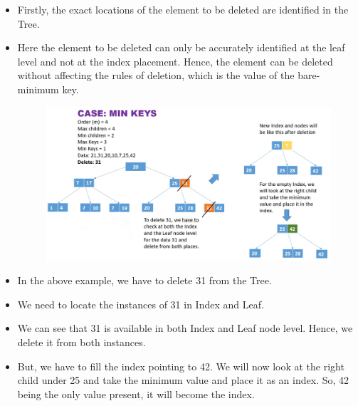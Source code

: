 \documentclass[11pt, a4paper]{article}
\begin{document}
\begin{itemize}
    \item Firstly, the exact locations of the element to be deleted are identified in the Tree.
    \item Here the element to be deleted can only be accurately identified at the leaf level and not at the index placement. Hence, the element can be deleted without affecting the rules of deletion, which is the value of the bare-minimum key.
    
    \begin{figure}[h]
    \centering
    \includegraphics[scale=.5]{del2.jpeg}
    \label{del2}
\end{figure}
    
    \item In the above example, we have to delete 31 from the Tree.
    \item We need to locate the instances of 31 in Index and Leaf.
    \item We can see that 31 is available in both Index and Leaf node level. Hence, we delete it from both instances.
    \item But, we have to fill the index pointing to 42. We will now look at the right child under 25 and take the minimum value and place it as an index. So, 42 being the only value present, it will become the index.
\end{itemize} \vspace{1cm}
\end{document}

